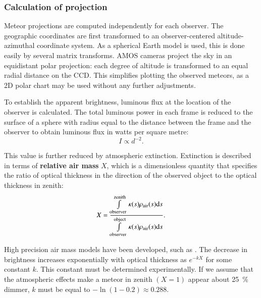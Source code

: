         \subsubsection{Calculation of projection}
            Meteor projections are computed independently for each observer.
            The geographic coordinates are first transformed to an observer-centered altitude-azimuthal coordinate system.
            As a spherical Earth model is used, this is done easily by several matrix transforms.            
            AMOS cameras project the sky in an equidistant polar projection: each degree of altitude is
            transformed to an equal radial distance on the CCD. This simplifies plotting
            the observed meteors, as a 2D polar chart may be used without any further adjustments.
            
            To establish the apparent brightness, luminous flux at the location of the observer is calculated.
            The total luminous power in each frame is reduced to the surface of a sphere with radius equal
            to the distance between the frame and the observer to obtain luminous flux in watts per square metre:
            \begin{equation}
                I \propto d^{-2}\text{.}
                \label{sim:al:po:cp:d}
            \end{equation}
            
            This value is further reduced by atmospheric extinction. Extinction is described in terms of \textbf{relative air mass} $X$,
            which is a dimensionless quantity that specifies the ratio of optical thickness in the direction of the observed
            object to the optical thickness in zenith:
            \begin{equation}
                X = \frac{%
                    \int\limits_{\text{observer}}^{\text{zenith}} \kappa(s)\rho_{\mathrm{air}}(s) \mathrm{d}s%
                }{%
                    \int\limits_{\text{observer}}^{\text{object}} \kappa(s)\rho_{\mathrm{air}}(s) \mathrm{d}s%
                }\text{.}
                \label{sim:al:po:cp:airmass}
            \end{equation}
            
            High precision air mass models have been developed, such as \cite{kasten-young1989}.
            The decrease in brightness increases exponentially with optical thickness as $e^{-kX}$ for some constant $k$.
            This constant must be determined experimentally. If we assume that the atmospheric effects make
            a meteor in zenith $(X = 1)$ appear about \SI{25}{\percent} dimmer, $k$ must be equal to
            $-\ln \left(1 - 0.2\right) \approx 0.288$.
            
